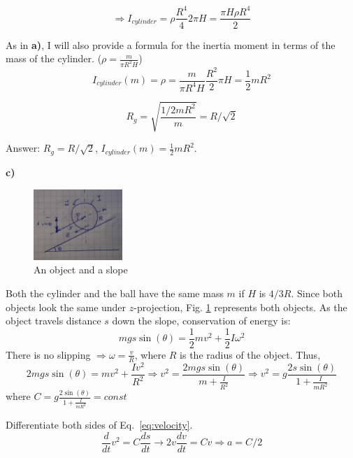 \documentclass{article}
\begin{document}
\begin{equation*}
  \Rightarrow I_{cylinder} = \rho \frac{R^4}{4} 2\pi H = \frac{\pi H\rho R^4}{2}
\end{equation*}

As in \textbf{a)}, I will also provide a formula for the inertia moment in terms of the mass of the cylinder. ($\rho = \frac{m}{\pi R^2 H}$)
\begin{equation*}
  I_{cylinder}(m) = \rho = \frac{m}{\pi R^4 H} \frac{R^2}{2} \pi H = \frac{1}{2} mR^2
\end{equation*}

\begin{equation*}
  R_g = \sqrt{\frac{1/2mR^2}{m}} = R/\sqrt{2}
\end{equation*}
  
Answer: $R_g = R/\sqrt{2}$, $I_{cylinder}(m) = \frac{1}{2} mR^2$.

\textbf{c)}
\begin{figure}[H]
  \centering
  \includegraphics[width=0.3\textwidth]{calculus/W5/img/2c}
  \caption{An object and a slope}
  \label{fig:slope}
\end{figure}

Both the cylinder and the ball have the same mass $m$ if $H$ is $4/3R$. Since both objects look the same under $z$-projection, Fig. \ref{fig:slope} represents both objects. As the object travels distance $s$ down the slope, conservation of energy is:
\begin{equation*}
  mgs \sin(\theta) = \frac{1}{2}mv^2 + \frac{1}{2}I\omega^2
\end{equation*}
There is no slipping $\Rightarrow \omega = \frac{v}{R}$, where $R$ is the radius of the object. Thus,
\begin{equation} \label{eq:velocity}
  2mg s \sin(\theta) = mv^2 + \frac{Iv^2}{R^2} \Rightarrow v^2 = \frac{2mgs \sin(\theta)}{m + \frac{I}{R^2}} \Rightarrow v^2 = g\frac{2s\sin(\theta)}{1 + \frac{I}{mR^2}} 
\end{equation}
where $C =g\frac{2\sin(\theta)}{1 + \frac{I}{mR^2}} = const$

Differentiate both sides of Eq.~\eqref{eq:velocity}.
\begin{equation*}
  \frac{d}{dt} v^2 = C \frac{ds}{dt} \rightarrow 2v \frac{dv}{dt} = Cv \Rightarrow a = C/2
\end{equation*}
\end{document}
